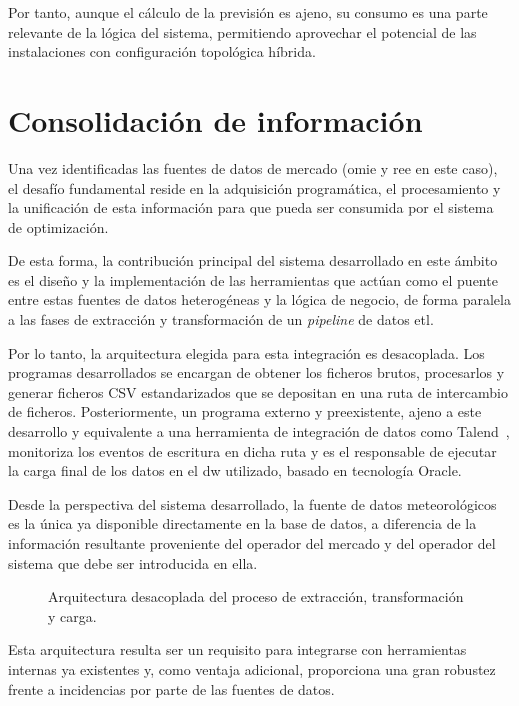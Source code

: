 Por tanto, aunque el cálculo de la previsión es ajeno, su consumo es una parte relevante de la lógica del sistema, permitiendo aprovechar el potencial de las instalaciones con configuración topológica híbrida.

\section{Consolidación de información}
\label{makereference4.4}

Una vez identificadas las fuentes de datos de mercado (\gls{omie} y \gls{ree} en este caso), el desafío fundamental reside en la adquisición programática, el procesamiento y la unificación de esta información para que pueda ser consumida por el sistema de optimización.

De esta forma, la contribución principal del sistema desarrollado en este ámbito es el diseño y la implementación de las herramientas que actúan como el puente entre estas fuentes de datos heterogéneas y la lógica de negocio, de forma paralela a las fases de extracción y transformación de un \textit{pipeline} de datos \gls{etl}.

Por lo tanto, la arquitectura elegida para esta integración es desacoplada. Los programas desarrollados se encargan de obtener los ficheros brutos, procesarlos y generar ficheros CSV estandarizados que se depositan en una ruta de intercambio de ficheros. Posteriormente, un programa externo y preexistente, ajeno a este desarrollo y equivalente a una herramienta de integración de datos como Talend~\cite{talend2025modern}, monitoriza los eventos de escritura en dicha ruta y es el responsable de ejecutar la carga final de los datos en el \gls{dw} utilizado, basado en tecnología Oracle.

Desde la perspectiva del sistema desarrollado, la fuente de datos meteorológicos es la única ya disponible directamente en la base de datos, a diferencia de la información resultante proveniente del operador del mercado y del operador del sistema que debe ser introducida en ella.

\begin{figure}
  \centering
  \caption[Arquitectura desacoplada del proceso de datos.]{Arquitectura desacoplada del proceso de extracción, transformación y carga.}
  \label{fig:arquitectura-mercado}
\end{figure}

Esta arquitectura resulta ser un requisito para integrarse con herramientas internas ya existentes y, como ventaja adicional, proporciona una gran robustez frente a incidencias por parte de las fuentes de datos.

